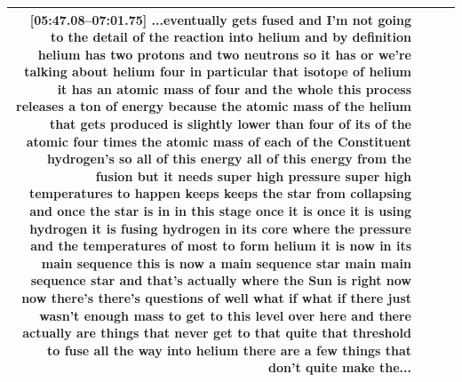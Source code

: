 \documentclass[10pt]{article}
\begin{document}
\begin{tiny}
\begin{longtable}{|r|p{0.375in}|p{1.275in}|p{3.5in}|}
                                                                                                                                                                                                                                                                                                                                                                                                                                                                                                                                                                                                                                                 \textbf{[05:47.08--07:01.75]} ...eventually gets fused and I'm not going to the detail of the reaction into helium and by definition helium has two protons and two neutrons so it has or we're talking about helium four in particular that isotope of helium it has an atomic mass of four and the whole this process releases a ton of energy because the atomic mass of the helium that gets produced is slightly lower than four of its of the atomic four times the atomic mass of each of the Constituent hydrogen's so all of this energy all of this energy from the fusion but it needs super high pressure super high temperatures to happen keeps keeps the star from collapsing and once the star is in in this stage once it is once it is using hydrogen it is fusing hydrogen in its core where the pressure and the temperatures of most to form helium it is now in its main sequence this is now a main sequence star main main sequence star and that's actually where the Sun is right now now there's there's questions of well what if what if there just wasn't enough mass to get to this level over here and there actually are things that never get to that quite that threshold to fuse all the way into helium there are a few things that don't quite make the... \\\hline

\end{longtable}
\end{tiny}
\end{document}
